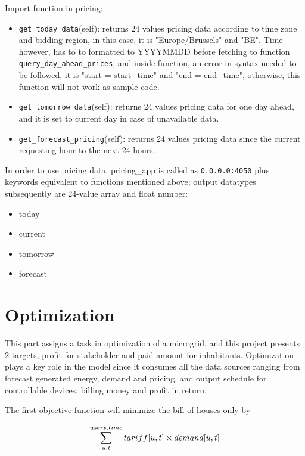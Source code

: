 \documentclass[runningheads]{llncs}
\begin{document}
\medskip
{\raggedleft Import function in pricing:}
\begin{itemize}
	\item \texttt{get\_today\_data}(self): returns 24 values pricing data according to time zone and bidding region, in this case, it is "Europe/Brussels" and "BE". Time however, has to to formatted to YYYYMMDD before fetching to function \texttt{query\_day\_ahead\_prices}, and inside function, an error in syntax needed to be followed, it is "start = start\_time" and "end = end\_time", otherwise, this function will not work as sample code\cite{entsoe}. 
	
	\item \texttt{get\_tomorrow\_data}(self): returns 24 values pricing data for one day ahead, and it is set to current day in case of unavailable data.
	
	\item \texttt{get\_forecast\_pricing}(self): returns 24 values pricing data since the current requesting hour to the next 24 hours.
	
\end{itemize}

In order to use pricing data, pricing\_app is called as \texttt{0.0.0.0:4050} plus keywords equivalent to functions mentioned above; output datatypes subsequently are 24-value array and float number:
\begin{itemize}
	\item today
	\item current
	\item tomorrow
	\item forecast
\end{itemize}

\section{Optimization}
This part assigns a task in optimization of a microgrid, and this project presents 2 targets, profit for stakeholder and paid amount for inhabitants. Optimization plays a key role in the model since it consumes all the data sources ranging from forecast generated energy, demand and pricing, and output schedule for controllable devices, billing money and profit in return.

The first objective function will minimize the bill of houses only by \newline

\[\displaystyle \sum_{u,t}^{\\users,time} tariff[u,t] \times demand[u,t]\]
\end{document}
